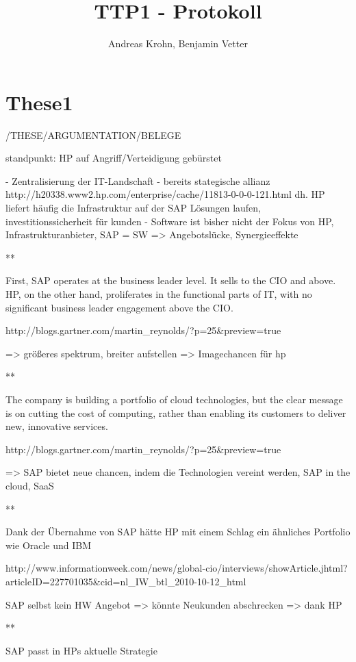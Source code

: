 \documentclass[a4paper,10pt]{article}
\title{TTP1 - Protokoll}
\author{Andreas Krohn, Benjamin Vetter}
\begin{document}
\maketitle

\section{These1}

/THESE/ARGUMENTATION/BELEGE

standpunkt: HP auf Angriff/Verteidigung gebürstet

- Zentralisierung der IT-Landschaft
- bereits stategische allianz http://h20338.www2.hp.com/enterprise/cache/11813-0-0-0-121.html dh. HP liefert häufig die Infrastruktur auf der SAP Lösungen laufen, investitionssicherheit für kunden
- Software ist bisher nicht der Fokus von HP, Infrastrukturanbieter, SAP = SW => Angebotslücke, Synergieeffekte

**

First, SAP operates at the business leader level. It sells to the CIO and above. HP, on the other hand, proliferates in the functional parts of IT, with no significant business leader engagement above the CIO.

http://blogs.gartner.com/martin_reynolds/?p=25&preview=true

=> größeres spektrum, breiter aufstellen 
=> Imagechancen für hp

**

The company is building a portfolio of cloud technologies, but the clear message is on cutting the cost of computing, rather than enabling its customers to deliver new, innovative services.

http://blogs.gartner.com/martin_reynolds/?p=25&preview=true

=> SAP bietet neue chancen, indem die Technologien vereint werden, SAP in the cloud, SaaS

**

Dank der Übernahme von SAP hätte HP mit einem Schlag ein ähnliches Portfolio wie Oracle und IBM

http://www.informationweek.com/news/global-cio/interviews/showArticle.jhtml?articleID=227701035&cid=nl_IW_btl_2010-10-12_html

SAP selbst kein HW Angebot => könnte Neukunden abschrecken => dank HP 

**

SAP passt in HPs aktuelle Strategie
\end{document}
